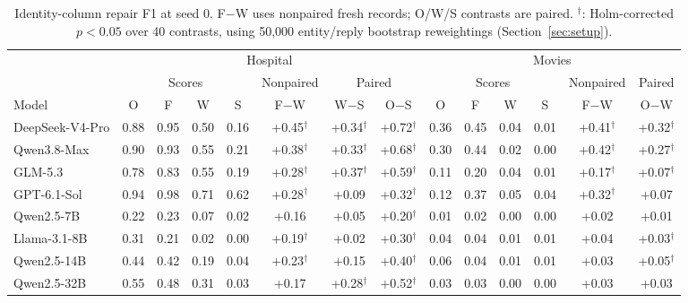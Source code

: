 \begin{table}[t]
  \caption{Identity-column repair F1 at seed 0. F$-$W uses nonpaired fresh records; O/W/S contrasts are paired. $^\dagger$: Holm-corrected $p<0.05$ over 40 contrasts, using 50,000 entity/reply bootstrap reweightings (Section~\ref{sec:setup}).}
  \label{tab:main}
  \small
  \begin{tabular*}{\textwidth}{@{\extracolsep{\fill}}l cccc ccc cccc cc@{}}
    \toprule
    & \multicolumn{7}{c}{Hospital} & \multicolumn{6}{c}{Movies} \\
    \cmidrule(lr){2-8}\cmidrule(l){9-14}
    & \multicolumn{4}{c}{Scores} & Nonpaired & \multicolumn{2}{c}{Paired} & \multicolumn{4}{c}{Scores} & Nonpaired & Paired \\
    \cmidrule(lr){2-5}\cmidrule(lr){6-6}\cmidrule(lr){7-8}\cmidrule(lr){9-12}\cmidrule(lr){13-13}\cmidrule(l){14-14}
    Model & O & F & W & S & F$-$W & W$-$S & O$-$S & O & F & W & S & F$-$W & O$-$W \\
    \midrule
    DeepSeek-V4-Pro & 0.88 & 0.95 & 0.50 & 0.16 & +0.45$^\dagger$ & +0.34$^\dagger$ & +0.72$^\dagger$ & 0.36 & 0.45 & 0.04 & 0.01 & +0.41$^\dagger$ & +0.32$^\dagger$ \\
    Qwen3.8-Max & 0.90 & 0.93 & 0.55 & 0.21 & +0.38$^\dagger$ & +0.33$^\dagger$ & +0.68$^\dagger$ & 0.30 & 0.44 & 0.02 & 0.00 & +0.42$^\dagger$ & +0.27$^\dagger$ \\
    GLM-5.3 & 0.78 & 0.83 & 0.55 & 0.19 & +0.28$^\dagger$ & +0.37$^\dagger$ & +0.59$^\dagger$ & 0.11 & 0.20 & 0.04 & 0.01 & +0.17$^\dagger$ & +0.07$^\dagger$ \\
    GPT-6.1-Sol & 0.94 & 0.98 & 0.71 & 0.62 & +0.28$^\dagger$ & +0.09 & +0.32$^\dagger$ & 0.12 & 0.37 & 0.05 & 0.04 & +0.32$^\dagger$ & +0.07 \\
    \midrule
    Qwen2.5-7B & 0.22 & 0.23 & 0.07 & 0.02 & +0.16 & +0.05 & +0.20$^\dagger$ & 0.01 & 0.02 & 0.00 & 0.00 & +0.02 & +0.01 \\
    Llama-3.1-8B & 0.31 & 0.21 & 0.02 & 0.00 & +0.19$^\dagger$ & +0.02 & +0.30$^\dagger$ & 0.04 & 0.04 & 0.01 & 0.01 & +0.04 & +0.03$^\dagger$ \\
    Qwen2.5-14B & 0.44 & 0.42 & 0.19 & 0.04 & +0.23$^\dagger$ & +0.15 & +0.40$^\dagger$ & 0.06 & 0.04 & 0.01 & 0.01 & +0.03 & +0.05$^\dagger$ \\
    Qwen2.5-32B & 0.55 & 0.48 & 0.31 & 0.03 & +0.17 & +0.28$^\dagger$ & +0.52$^\dagger$ & 0.03 & 0.03 & 0.00 & 0.00 & +0.03 & +0.03 \\
    \bottomrule
  \end{tabular*}
\end{table}
